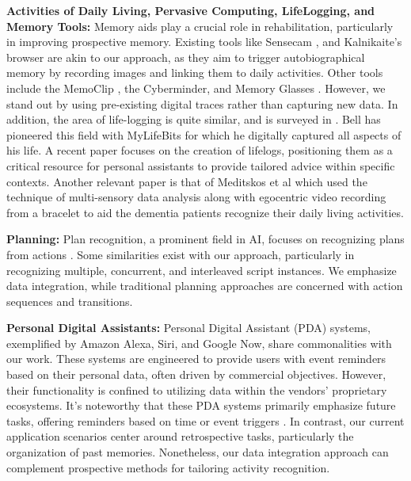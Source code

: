 \documentclass[11pt]{article}
\begin{document}
\textbf{Activities of Daily Living, Pervasive Computing, LifeLogging, and Memory Tools:}
Memory aids play a crucial role in rehabilitation, particularly in improving prospective memory. Existing tools like Sensecam  \cite{hodges2006sensecam}, and Kalnikaite's browser \cite{kalnikaite2010now}  are akin to our approach, as they aim to trigger autobiographical memory by recording images and linking them to daily activities. Other tools include the MemoClip , the Cyberminder, and Memory Glasses \cite{memoclip,devaulmemory,deycybreminder}. However, we stand out by using pre-existing digital traces rather than capturing new data. In addition, the area of life-logging is quite similar, and is
surveyed in \cite{gurrin2014lifelogging,van2012introduction}. Bell has pioneered this field with MyLifeBits \cite{mylifebits} for which he digitally captured all aspects of his life. A recent paper \cite{timelinebuilder} focuses on the creation of lifelogs, positioning them as a critical resource for personal assistants to provide tailored advice within specific contexts. Another relevant paper is that of Meditskos et al \cite{meditskos2018multi} which used the technique of multi-sensory data analysis along with egocentric video recording from a bracelet to aid the dementia patients recognize their daily living activities.

\textbf{Planning:}
Plan recognition, a prominent field in AI, focuses on recognizing plans from actions \cite{planDagstuhl11,BuiBook}. Some similarities exist with our approach, particularly in recognizing multiple, concurrent, and interleaved script instances. We emphasize data integration, while traditional planning approaches are concerned with action sequences and transitions.

\textbf{Personal Digital Assistants:}
Personal Digital Assistant (PDA) systems, exemplified by Amazon Alexa, Siri, and Google Now, share commonalities with our work. These systems are engineered to provide users with event reminders based on their personal data, often driven by commercial objectives. However, their functionality is confined to utilizing data within the vendors' proprietary ecosystems. It's noteworthy that these PDA systems primarily emphasize future tasks, offering reminders based on time or event triggers \cite{schacter2002seven}. In contrast, our current application scenarios center around retrospective tasks, particularly the organization of past memories. Nonetheless, our data integration approach can complement prospective methods for tailoring activity recognition. 
\end{document}
